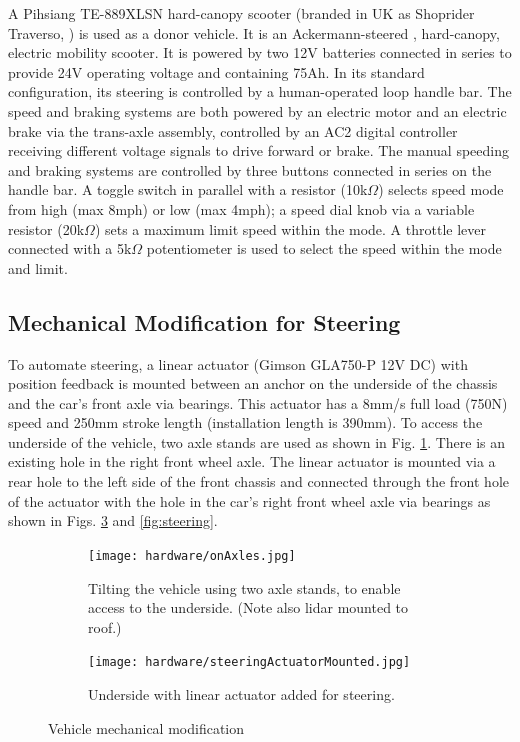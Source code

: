 \documentclass[a4paper]{article}
\begin{document}
	A Pihsiang TE-889XLSN hard-canopy scooter (branded in UK as Shoprider Traverso, \cite{shoprider2016shoprider}) is used as a donor vehicle. It is an Ackermann-steered \cite{milliken1995race}, hard-canopy, electric mobility scooter. It is powered by two 12V batteries connected in series to provide 24V operating voltage and containing 75Ah. In its standard configuration, its steering is controlled by a human-operated loop handle bar. The speed and braking systems are both powered by an electric motor and an electric brake via the trans-axle assembly, controlled by an AC2 digital controller receiving different voltage signals to drive forward or brake. The manual speeding and braking systems are controlled by three buttons connected in series on the handle bar. A toggle switch in parallel with a resistor (10k$\Omega$) selects  speed mode from high (max 8mph) or low (max 4mph); a speed dial knob via a variable resistor (20k$\Omega$) sets a maximum limit speed within the mode. A throttle lever connected with a 5k$\Omega$ potentiometer is used to select the speed within the mode and limit.
	
	\subsection{Mechanical Modification for Steering}
	
	To automate steering, a linear actuator (Gimson GLA750-P 12V DC) with position feedback is mounted between an anchor on the underside of the chassis and the car's front axle via bearings.  This actuator has a 8mm/s full load (750N) speed and 250mm stroke length (installation length is 390mm). To access the underside of the vehicle, two axle stands are used as shown in Fig. \ref{fig:axelStands}. There is an existing hole in the right front wheel axle. The linear actuator is mounted via a rear hole to the left side of the front chassis and connected through the front hole of the actuator with the hole in the car's right front wheel axle via bearings as shown in Figs. \ref{fig:actuatorMounted} and \ref{fig:steering}.
	
	
	\begin{figure}
		\centering
		\begin{subfigure}{0.45\textwidth}
			\centering
			\texttt{[image: hardware/onAxles.jpg]}
			\caption{Tilting the vehicle using two axle stands, to enable access to the underside. (Note also lidar mounted to roof.)}
			\label{fig:axelStands}
		\end{subfigure}	
		\quad
		\begin{subfigure}{0.45\textwidth}
			\centering
			\texttt{[image: hardware/steeringActuatorMounted.jpg]}
			\caption{Underside with linear actuator added for steering.}
			\label{fig:actuatorMounted}
		\end{subfigure}
		\caption{Vehicle mechanical modification}
	\end{figure}
	
\end{document}
